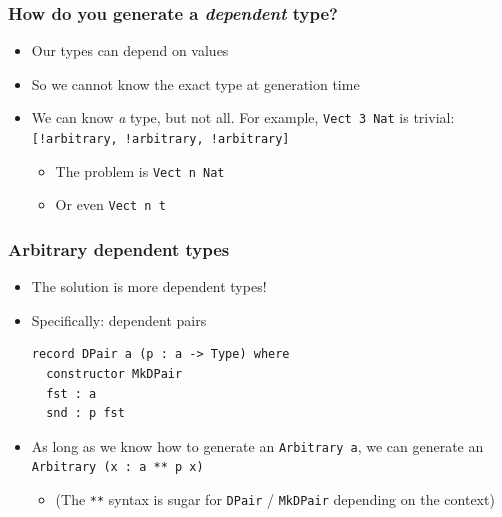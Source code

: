 \documentclass[compress,handout]{beamer}
\begin{document}
\begin{frame}
  \frametitle{How do you generate a \emph{dependent} type?}

  \begin{itemize}
    \item<1-> Our types can depend on values
    \item<2-> So we cannot know the exact type at generation time
    \item<3-> We can know \textit{a} type, but not all. For example,
              \texttt{Vect 3 Nat} is trivial:
              \texttt{[!arbitrary, !arbitrary, !arbitrary]}
    \begin{itemize}
      \item<4-> The problem is\hspace*{2mm} \texttt{Vect n Nat}
      \item<5-> Or even\hspace*{2mm} \texttt{Vect n t}
    \end{itemize}
  \end{itemize}

\end{frame}


\begin{frame}[fragile]
  \frametitle{Arbitrary dependent types}

  \begin{itemize}
    \item<1-> The solution is more dependent types!
    \item<2-> Specifically: dependent pairs

    \begin{verbatim}
record DPair a (p : a -> Type) where
  constructor MkDPair
  fst : a
  snd : p fst
    \end{verbatim}

    \item<3-> As long as we know how to generate an {\textasciigrave
              \texttt{Arbitrary a}\textasciigrave}, we can generate
              an {\textasciigrave
              \texttt{Arbitrary (x : a ** p x)}\textasciigrave}
    \begin{itemize}
      \item<3-> (The \texttt{**} syntax is sugar for
                \texttt{DPair} / \texttt{MkDPair}
                depending on the context)
    \end{itemize}
  \end{itemize}

\end{frame}
\end{document}

